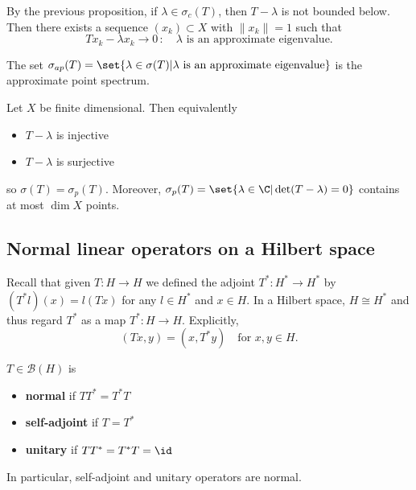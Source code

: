 \documentclass{article}
\begin{document}
\begin{remark}
    By the previous proposition, if $\lambda \in \sigma_c(T)$, then $T-\lambda$ is not bounded below. Then there exists a sequence $(x_k) \subset X$ with $\|x_k\|=1$ such that
    \begin{equation*}
        T x_k - \lambda x_k \to 0 \, : \quad \lambda \text{ is an approximate eigenvalue.}
    \end{equation*}

    The set $\sigma_{ap}(T) = \set{\lambda \in \sigma(T) | \lambda \text{ is an approximate eigenvalue}}$ is the approximate point spectrum.
\end{remark}

\begin{eg}
    Let $X$ be finite dimensional. Then equivalently
    \begin{itemize}
        \item $T - \lambda$ is injective
        \item $T - \lambda$ is surjective
    \end{itemize}
    so $\sigma(T) = \sigma_p(T)$. Moreover, $\sigma_p(T) = \set{\lambda \in \C | \det(T - \lambda) =0}$ contains at most $\dim X$ points.
\end{eg}

\subsection{Normal linear operators on a Hilbert space}
Recall that given $T: H \to H$ we defined the adjoint $T^* : H^* \to H^*$ by $(T^* l)(x) = l(T x)$ for any $l \in H^*$ and $x \in H$.
In a Hilbert space, $H \cong H^*$ and thus regard $T^*$ as a map $T^*: H \to H$. Explicitly,
\begin{equation*}
    (Tx, y) = (x, T^* y) \quad \text{for } x, y \in H.
\end{equation*}

\begin{defi}
    $T \in \mathcal{B}(H)$ is
    \begin{itemize}
        \item \textbf{normal} if $T T^* = T^* T$
        \item \textbf{self-adjoint} if $T = T^*$
        \item \textbf{unitary} if $T T^* = T^* T = \id$
    \end{itemize}
    In particular, self-adjoint and unitary operators are normal.
\end{defi}
\end{document}
